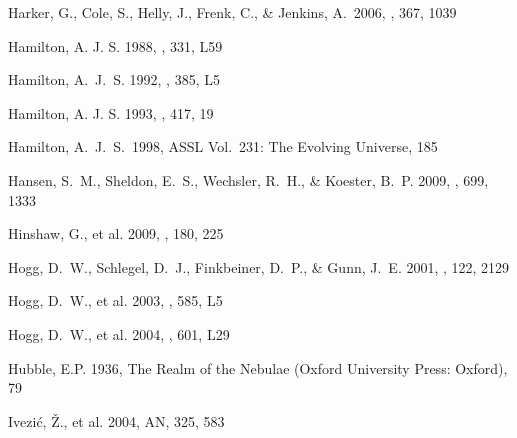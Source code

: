 \documentclass[]{emulateapj}
\begin{document}
\begin{thebibliography}{999}
Harker, G., Cole, S., Helly, J., Frenk, C., \& Jenkins, A.\ 2006, 
\mnras, 367, 1039 

Hamilton, A. J. S. 1988, \apj, 331, L59

Hamilton, A.\ J.\ S. 1992, \apj, 385, L5

Hamilton, A. J. S. 1993, \apj, 417, 19

Hamilton, A.\ J.\ S.\ 1998, ASSL Vol.\ 231: The Evolving Universe, 185

Hansen, S.\ M., Sheldon, E.\ S., Wechsler, R.\ H., \& Koester, B.\ P. 2009,
\apj, 699, 1333


Hinshaw, G., et al. 2009, \apjs, 180, 225

Hogg, D.\ W., Schlegel, D.\ J., Finkbeiner, D.\ P., \& Gunn, J.\ E. 2001, 
\aj, 122, 2129

Hogg, D.\ W., et al. 2003, \apj, 585, L5 

Hogg, D.\ W., et al. 2004, \apj, 601, L29


Hubble, E.P. 1936, The Realm of the Nebulae (Oxford University Press: Oxford),
79

Ivezi\'{c}, \v{Z}., et al. 2004, AN, 325, 583 


\end{thebibliography}
\end{document}
